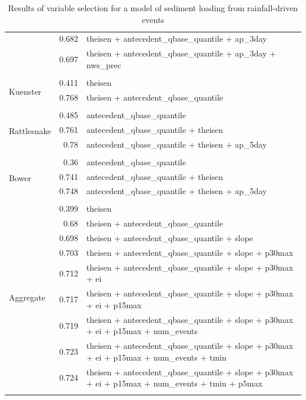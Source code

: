 \documentclass[10pt]{article}
\begin{document}
\begin{table}[h]
\begin{center}
\begin{tabular}{lrl}
 & 0.682 & theisen + antecedent\_qbase\_quantile + ap\_3day\\ 
 & 0.697 & theisen + antecedent\_qbase\_quantile + ap\_3day + nws\_prec\\ 
\vspace{2mm}\\ \multirow{3}{*}{Kuenster} & 0.411 & theisen\\ 
 & 0.768 & theisen + antecedent\_qbase\_quantile\\ 
\vspace{2mm}\\ \multirow{4}{*}{Rattlesnake} & 0.485 & antecedent\_qbase\_quantile\\ 
 & 0.761 & antecedent\_qbase\_quantile + theisen\\ 
 & 0.78 & antecedent\_qbase\_quantile + theisen + ap\_5day\\ 
\vspace{2mm}\\ \multirow{4}{*}{Bower} & 0.36 & antecedent\_qbase\_quantile\\ 
 & 0.741 & antecedent\_qbase\_quantile + theisen\\ 
 & 0.748 & antecedent\_qbase\_quantile + theisen + ap\_5day\\ 
\vspace{2mm}\\ \multirow{10}{*}{Aggregate} & 0.399 & theisen\\ 
 & 0.68 & theisen + antecedent\_qbase\_quantile\\ 
 & 0.698 & theisen + antecedent\_qbase\_quantile + slope\\ 
 & 0.703 & theisen + antecedent\_qbase\_quantile + slope + p30max\\ 
 & 0.712 & theisen + antecedent\_qbase\_quantile + slope + p30max + ei\\ 
 & 0.717 & theisen + antecedent\_qbase\_quantile + slope + p30max + ei + p15max\\ 
 & 0.719 & theisen + antecedent\_qbase\_quantile + slope + p30max + ei + p15max + num\_events\\ 
 & 0.723 & theisen + antecedent\_qbase\_quantile + slope + p30max + ei + p15max + num\_events + tmin\\ 
 & 0.724 & theisen + antecedent\_qbase\_quantile + slope + p30max + ei + p15max + num\_events + tmin + p5max\\ 
\vspace{2mm}\\     \end{tabular}
    \caption{Results of variable selection for a model of sediment loading from rainfall-driven events\label{sed_r_square_nosnow}}
    \end{center}
\end{table}
\end{document}
